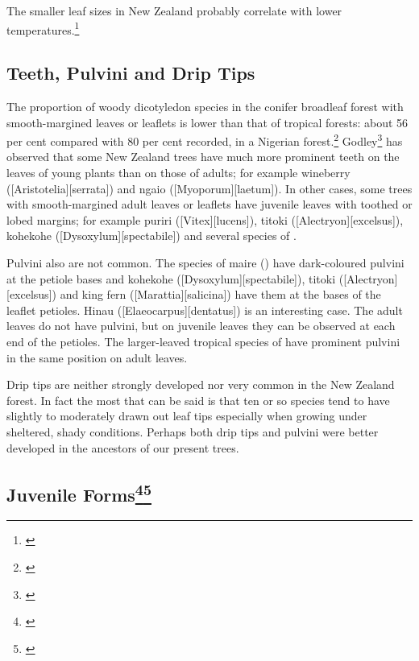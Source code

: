 The smaller leaf sizes in New Zealand probably correlate with lower temperatures.\footnote{\cite{dawson1986floristic}}

\subsection{Teeth, Pulvini and Drip Tips}

The proportion of woody dicotyledon species in the conifer broadleaf forest with smooth-margined leaves or leaflets is lower than that of tropical forests: about 56 per cent compared with 80 per cent recorded, in a Nigerian forest.\footnote{\cite{richards1952tropical}}
Godley\footnote{\cite{godley1985paths}} has observed that some New Zealand trees have much more prominent teeth on the leaves of young plants than on those of adults; for example wineberry ([Aristotelia][serrata]) and ngaio ([Myoporum][laetum]).
In other cases, some trees with smooth-margined adult leaves or leaflets have juvenile leaves with toothed or lobed margins; for example puriri ([Vitex][lucens]), titoki ([Alectryon][excelsus]), kohekohe ([Dysoxylum][spectabile]) and several species of .

Pulvini also are not common.
The species of maire () have dark-coloured pulvini at the petiole bases and kohekohe ([Dysoxylum][spectabile]), titoki ([Alectryon][excelsus]) and king fern ([Marattia][salicina]) have them at the bases of the leaflet petioles.
Hinau ([Elaeocarpus][dentatus]) is an interesting case.
The adult leaves do not have pulvini, but on juvenile leaves they can be observed at each end of the petioles.
The larger-leaved tropical species of  have prominent pulvini in the same position on adult leaves.

Drip tips are neither strongly developed nor very common in the New Zealand forest.
In fact the most that can be said is that ten or so species tend to have slightly to moderately drawn out leaf tips especially when growing under sheltered, shady conditions.
Perhaps both drip tips and pulvini were better developed in the ancestors of our present trees.

\subsection[Juvenile Forms]{Juvenile Forms\footnote{\cite{godley1985paths}}\footnote{\cite{philipson1964habit}}}

